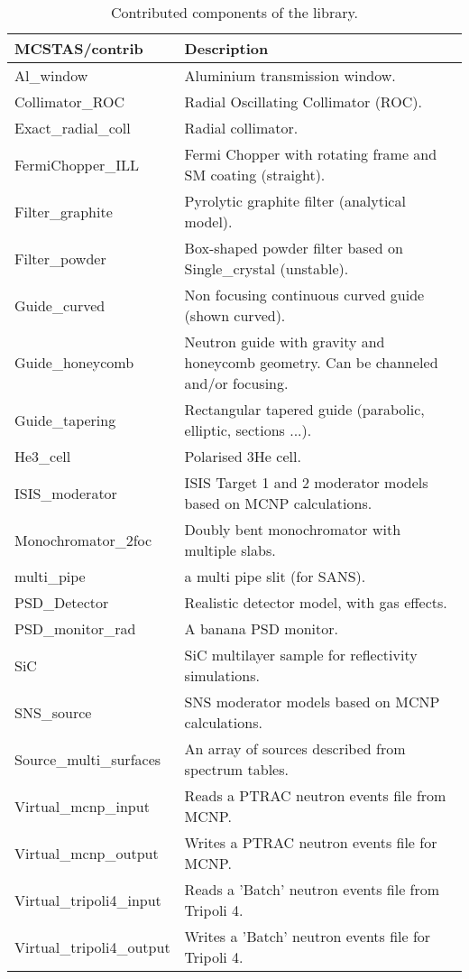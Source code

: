 \begin{table}
  \begin{center}
    {\let\my=\\
    \begin{tabular}{|p{}|p{}|}
      \hline
       {\bf MCSTAS/contrib} & Description \\
       \hline
 Al\_window     &         Aluminium transmission window. \\
 Collimator\_ROC   &      Radial Oscillating Collimator (ROC). \\
 Exact\_radial\_coll &      Radial collimator. \\
 FermiChopper\_ILL &       Fermi Chopper with rotating frame and SM coating (straight). \\
 Filter\_graphite  &      Pyrolytic graphite filter (analytical model). \\
 Filter\_powder   &       Box-shaped powder
                        filter based on Single\_crystal (unstable). \\
 Guide\_curved     &     Non focusing continuous curved guide (shown curved). \\
 Guide\_honeycomb & Neutron guide with gravity and honeycomb geometry. Can be
                        channeled and/or focusing. \\
 Guide\_tapering  &     Rectangular tapered guide (parabolic, elliptic, sections ...). \\
 He3\_cell    &           Polarised 3He cell. \\
 ISIS\_moderator    &     ISIS Target 1 and 2 moderator models based on MCNP calculations. \\
 Monochromator\_2foc   &  Doubly bent monochromator with multiple slabs. \\
 multi\_pipe       & a multi pipe slit (for SANS). \\
 PSD\_Detector  & Realistic detector model, with gas effects. \\
 PSD\_monitor\_rad & A banana PSD monitor. \\
 SiC           &         SiC multilayer sample for reflectivity simulations. \\
 SNS\_source    & SNS moderator models based on MCNP calculations. \\
 Source\_multi\_surfaces & An array of sources described from spectrum tables. \\
 Virtual\_mcnp\_input & Reads a PTRAC neutron events file from MCNP. \\
 Virtual\_mcnp\_output& Writes a PTRAC neutron events file for MCNP. \\
 Virtual\_tripoli4\_input & Reads a 'Batch' neutron events file from Tripoli 4. \\
 Virtual\_tripoli4\_output& Writes a 'Batch' neutron events file for Tripoli 4. \\
      \hline
    \end{tabular}
    \caption{Contributed components of the \MCS library.}
    \label{t:comp-contrib}
    }
  \end{center}
\end{table}

